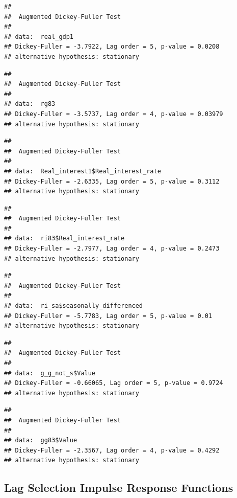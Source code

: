 \documentclass[11pt,preprint, authoryear]{elsarticle}
\numberwithin{equation}{section}
\numberwithin{figure}{section}
\numberwithin{table}{section}
\begin{document}
\begin{verbatim}
## 
##  Augmented Dickey-Fuller Test
## 
## data:  real_gdp1
## Dickey-Fuller = -3.7922, Lag order = 5, p-value = 0.0208
## alternative hypothesis: stationary
\end{verbatim}

\begin{verbatim}
## 
##  Augmented Dickey-Fuller Test
## 
## data:  rg83
## Dickey-Fuller = -3.5737, Lag order = 4, p-value = 0.03979
## alternative hypothesis: stationary
\end{verbatim}

\begin{verbatim}
## 
##  Augmented Dickey-Fuller Test
## 
## data:  Real_interest1$Real_interest_rate
## Dickey-Fuller = -2.6335, Lag order = 5, p-value = 0.3112
## alternative hypothesis: stationary
\end{verbatim}

\begin{verbatim}
## 
##  Augmented Dickey-Fuller Test
## 
## data:  ri83$Real_interest_rate
## Dickey-Fuller = -2.7977, Lag order = 4, p-value = 0.2473
## alternative hypothesis: stationary
\end{verbatim}

\begin{verbatim}
## 
##  Augmented Dickey-Fuller Test
## 
## data:  ri_sa$seasonally_differenced
## Dickey-Fuller = -5.7783, Lag order = 5, p-value = 0.01
## alternative hypothesis: stationary
\end{verbatim}

\begin{verbatim}
## 
##  Augmented Dickey-Fuller Test
## 
## data:  g_g_not_s$Value
## Dickey-Fuller = -0.66065, Lag order = 5, p-value = 0.9724
## alternative hypothesis: stationary
\end{verbatim}

\begin{verbatim}
## 
##  Augmented Dickey-Fuller Test
## 
## data:  gg83$Value
## Dickey-Fuller = -2.3567, Lag order = 4, p-value = 0.4292
## alternative hypothesis: stationary
\end{verbatim}

\hypertarget{lag-selection-impulse-response-functions}{%
\subsection{Lag Selection Impulse Response
Functions}\label{lag-selection-impulse-response-functions}}
\end{document}
